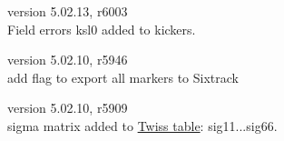 \begin{madlist}

   version 5.02.13, r6003 \\
  Field errors ksl0 added to kickers.





   version 5.02.10, r5946 \\
   add flag to export all markers to Sixtrack

  
  

   version 5.02.10, r5909 \\
   sigma matrix added to \hyperref[chap:twiss]{Twiss table}:  sig11...sig66. 

  

\end{madlist}
